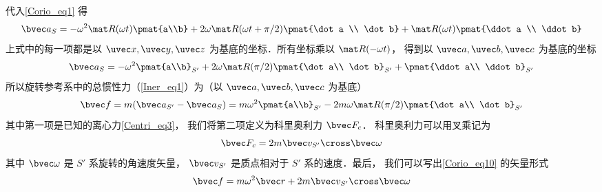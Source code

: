  代入\autoref{Corio_eq1} 得
\begin{equation}
\bvec a_{S} =
- \omega ^2 \mat R(\omega t)\pmat{a\\b} + 2\omega \mat R(\omega t + \pi /2)\pmat{\dot a \\ \dot b} + \mat R(\omega t)\pmat{\ddot a \\ \ddot b}
\end{equation}
上式中的每一项都是以 $\uvec x, \uvec y, \uvec z$ 为基底的坐标．所有坐标乘以 $\mat R(-\omega t)$， 得到以 $\uvec a, \uvec b, \uvec c$ 为基底的坐标
\begin{equation}
\bvec a_{S} =
- \omega^2 \pmat{a\\b}_{S'} + 2\omega \mat R(\pi /2)\pmat{\dot a\\ \dot b}_{S'} + \pmat{\ddot a\\ \ddot b}_{S'}
\end{equation}
所以旋转参考系中的总惯性力（\autoref{Iner_eq1}）为（以 $\uvec a, \uvec b, \uvec c$ 为基底）
\begin{equation}\label{Corio_eq10}
\bvec f = m(\bvec a_{S'} - \bvec a_{S})
=  m \omega ^2 \pmat{a\\b}_{S'} - 2m\omega \mat R(\pi /2)\pmat{\dot a\\ \dot b}_{S'}
\end{equation}
其中第一项是已知的离心力\autoref{Centri_eq3}， 我们将第二项定义为科里奥利力 $\bvec F_c$． 科里奥利力可以用叉乘记为
\begin{equation}
\bvec F_c = 2m \bvec v_{S'} \cross \bvec \omega
\end{equation}
其中 $\bvec\omega$ 是 $S'$ 系旋转的角速度矢量， $\bvec v_{S'}$ 是质点相对于 $S'$ 系的速度．最后， 我们可以写出\autoref{Corio_eq10} 的矢量形式
\begin{equation}
\bvec f = m \omega ^2 \bvec r + 2m \bvec v_{S'} \cross \bvec \omega 
\end{equation}
 




